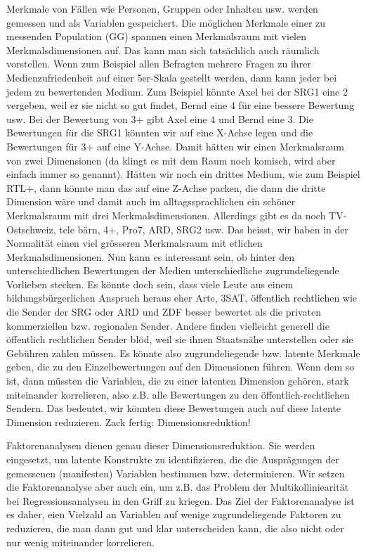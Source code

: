 \documentclass[
  10pt,
  letterpaper,
  a4paper, twoside]{scrreprt}
\begin{document}
Merkmale von Fällen wie Personen, Gruppen oder Inhalten usw. werden
gemessen und als Variablen gespeichert. Die möglichen Merkmale einer zu
messenden Population (GG) spannen einen Merkmalsraum mit vielen
Merkmalsdimensionen auf. Das kann man sich tatsächlich auch räumlich
vorstellen. Wenn zum Beispiel allen Befragten mehrere Fragen zu ihrer
Medienzufriedenheit auf einer 5er-Skala gestellt werden, dann kann jeder
bei jedem zu bewertenden Medium. Zum Beispiel könnte Axel bei der SRG1
eine 2 vergeben, weil er sie nicht so gut findet, Bernd eine 4 für eine
bessere Bewertung usw. Bei der Bewertung von 3+ gibt Axel eine 4 und
Bernd eine 3. Die Bewertungen für die SRG1 könnten wir auf eine X-Achse
legen und die Bewertungen für 3+ auf eine Y-Achse. Damit hätten wir
einen Merkmalsraum von zwei Dimensionen (da klingt es mit dem Raum noch
komisch, wird aber einfach immer so genannt). Hätten wir noch ein
drittes Medium, wie zum Beispiel RTL+, dann könnte man das auf eine
Z-Achse packen, die dann die dritte Dimension wäre und damit auch im
alltagssprachlichen ein schöner Merkmalsraum mit drei
Merkmalsdimensionen. Allerdings gibt es da noch TV-Ostschweiz, tele
bärn, 4+, Pro7, ARD, SRG2 usw. Das heisst, wir haben in der Normalität
einen viel grösseren Merkmalsraum mit etlichen Merkmalsdimensionen. Nun
kann es interessant sein, ob hinter den unterschiedlichen Bewertungen
der Medien unterschiedliche zugrundeliegende Vorlieben stecken. Es
könnte doch sein, dass viele Leute aus einem bildungsbürgerlichen
Anspruch heraus eher Arte, 3SAT, öffentlich rechtlichen wie die Sender
der SRG oder ARD und ZDF besser bewertet als die privaten kommerziellen
bzw. regionalen Sender. Andere finden vielleicht generell die öffentlich
rechtlichen Sender blöd, weil sie ihnen Staatsnähe unterstellen oder sie
Gebühren zahlen müssen. Es könnte also zugrundeliegende bzw. latente
Merkmale geben, die zu den Einzelbewertungen auf den Dimensionen führen.
Wenn dem so ist, dann müssten die Variablen, die zu einer latenten
Dimension gehören, stark miteinander korrelieren, also z.B. alle
Bewertungen zu den öffentlich-rechtlichen Sendern. Das bedeutet, wir
könnten diese Bewertungen auch auf diese latente Dimension reduzieren.
Zack fertig: Dimensionsreduktion!

Faktorenanalysen dienen genau dieser Dimensionsreduktion. Sie werden
eingesetzt, um latente Konstrukte zu identifizieren, die die
Ausprägungen der gemessenen (manifesten) Variablen bestimmen bzw.
determinieren. Wir setzen die Faktorenanalyse aber auch ein, um z.B. das
Problem der Multikolliniearität bei Regressionsanalysen in den Griff zu
kriegen. Das Ziel der Faktorenanalyse ist es daher, eien Vielzahl an
Variablen auf wenige zugrundeliegende Faktoren zu reduzieren, die man
dann gut und klar unterscheiden kann, die also nicht oder nur wenig
miteinander korrelieren.
\end{document}
